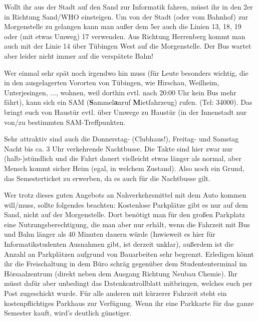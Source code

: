   Wollt ihr aus der Stadt auf den Sand zur Informatik fahren, müsst ihr in
  den 2er in Richtung Sand/WHO einsteigen.
  Um von der Stadt (oder vom Bahnhof) zur Morgenstelle zu gelangen kann man
  außer dem 5er auch die Linien 13, 18, 19 oder (mit etwas Umweg) 17 verwenden.
  Aus Richtung Herrenberg kommt man auch mit der Linie 14 über Tübingen West
  auf die Morgenstelle. Der Bus wartet aber leider nicht immer auf die verspätete Bahn!


Wer einmal sehr spät noch irgendwo hin muss (für Leute besonders
  wichtig, die in den ausgelagerten Vororten von Tübingen, wie Hirschau,
  Weilheim, Unterjesingen, ..., wohnen, weil dorthin evtl. nach 20:00 Uhr
  kein Bus mehr fährt), kann sich ein SAM (\textbf{S}ammel\textbf{a}nruf
  \textbf{M}ietfahrzeug) rufen. (Tel: 34000).  Das bringt euch von Haustür
  evtl. über Umwege zu Haustür (in der Innenstadt nur von/zu bestimmten
  SAM-Treffpunkten.

Sehr attraktiv sind auch die Donnerstag- (Clubhaus!), Freitag- und
  Samstag Nacht bis ca. 3 Uhr verkehrende Nachtbusse.  Die Takte sind
  hier zwar nur (halb-)stündlich und die Fahrt dauert vielleicht etwas
  länger als normal, aber Mensch kommt sicher Heim (egal, in
  welchem Zustand).  Also noch ein Grund, das Semesterticket zu
  erwerben, da es auch für die Nachtbusse gilt.

Wer trotz dieses guten Angebots an Nahverkehrsmittel mit dem Auto kommen will/muss,
  sollte folgendes beachten: Kostenlose Parkplätze gibt es nur auf dem Sand,
  nicht auf der Morgenstelle.  Dort benötigt man für den großen Parkplatz eine Nutzungsberechtigung, die man aber nur erhält,
  wenn die Fahrzeit mit Bus und Bahn länger als 40 Minuten dauern würde (Inwieweit es hier für Informatikstudenten Ausnahmen
  gibt, ist derzeit unklar), außerdem ist die Anzahl an Parkplätzen aufgrund von Bauarbeiten sehr begrenzt.
  Erledigen könnt ihr die Freischaltung in dem Büro
  schräg gegenüber dem Studententerminal im Hörsaalzentrum (direkt neben dem Ausgang Richtung Neubau Chemie).
  Ihr müsst dafür aber unbedingt das Datenkontrollblatt mitbringen,
  welches euch per Post zugeschickt wurde.
  Für alle anderen mit kürzerer Fahrzeit steht ein
  kostenpflichtiges Parkhaus zur Verfügung. Wenn ihr eine Parkkarte für das
  ganze Semester kauft, wird's deutlich günstiger.
  \vspace*{3cm}


